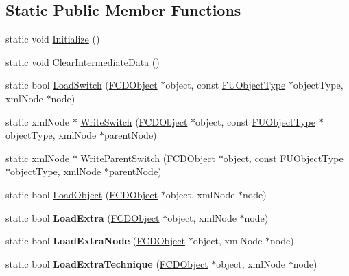\subsection*{Static Public Member Functions}
\begin{DoxyCompactItemize}
\item 
static void \hyperlink{classFArchiveXML_a9058483d29253567c3bbaa9e557e38b1}{Initialize} ()
\item 
static void \hyperlink{classFArchiveXML_ad9be9f3803f77996d7b155f2110a7105}{ClearIntermediateData} ()
\item 
static bool \hyperlink{classFArchiveXML_a6cc3fc2e4e1415c3c411a38f978c77ae}{LoadSwitch} (\hyperlink{classFCDObject}{FCDObject} $\ast$object, const \hyperlink{classFUObjectType}{FUObjectType} $\ast$objectType, xmlNode $\ast$node)
\item 
static xmlNode $\ast$ \hyperlink{classFArchiveXML_aaf83155ae7183ba1b4b485fdd239c483}{WriteSwitch} (\hyperlink{classFCDObject}{FCDObject} $\ast$object, const \hyperlink{classFUObjectType}{FUObjectType} $\ast$objectType, xmlNode $\ast$parentNode)
\item 
static xmlNode $\ast$ \hyperlink{classFArchiveXML_a2b455f62993fdcc77200439fb917748e}{WriteParentSwitch} (\hyperlink{classFCDObject}{FCDObject} $\ast$object, const \hyperlink{classFUObjectType}{FUObjectType} $\ast$objectType, xmlNode $\ast$parentNode)
\item 
static bool \hyperlink{classFArchiveXML_a262d6014344ef77f716e08e4149d4c16}{LoadObject} (\hyperlink{classFCDObject}{FCDObject} $\ast$object, xmlNode $\ast$node)
\item 
\hypertarget{classFArchiveXML_a1b7970ad7bb676ad4589adc156d0f49c}{
static bool {\bfseries LoadExtra} (\hyperlink{classFCDObject}{FCDObject} $\ast$object, xmlNode $\ast$node)}
\label{classFArchiveXML_a1b7970ad7bb676ad4589adc156d0f49c}

\item 
\hypertarget{classFArchiveXML_a535909ab9a6ad15b14db6a0496d505e6}{
static bool {\bfseries LoadExtraNode} (\hyperlink{classFCDObject}{FCDObject} $\ast$object, xmlNode $\ast$node)}
\label{classFArchiveXML_a535909ab9a6ad15b14db6a0496d505e6}

\item 
\hypertarget{classFArchiveXML_a53dcee9d989ad31d7b18c5a993988421}{
static bool {\bfseries LoadExtraTechnique} (\hyperlink{classFCDObject}{FCDObject} $\ast$object, xmlNode $\ast$node)}
\label{classFArchiveXML_a53dcee9d989ad31d7b18c5a993988421}


\end{DoxyCompactItemize}
